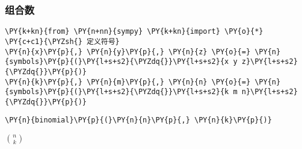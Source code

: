     \hypertarget{ux7ec4ux5408ux6570}{%
\subsubsection{组合数}\label{ux7ec4ux5408ux6570}}

    \begin{tcolorbox}[breakable, size=fbox, boxrule=1pt, pad at break*=1mm,colback=cellbackground, colframe=cellborder]
\begin{Verbatim}[commandchars=\\\{\}]
\PY{k+kn}{from} \PY{n+nn}{sympy} \PY{k+kn}{import} \PY{o}{*}
\PY{c+c1}{\PYZsh{} 定义符号}
\PY{n}{x}\PY{p}{,} \PY{n}{y}\PY{p}{,} \PY{n}{z} \PY{o}{=} \PY{n}{symbols}\PY{p}{(}\PY{l+s+s2}{\PYZdq{}}\PY{l+s+s2}{x y z}\PY{l+s+s2}{\PYZdq{}}\PY{p}{)}
\PY{n}{k}\PY{p}{,} \PY{n}{m}\PY{p}{,} \PY{n}{n} \PY{o}{=} \PY{n}{symbols}\PY{p}{(}\PY{l+s+s2}{\PYZdq{}}\PY{l+s+s2}{k m n}\PY{l+s+s2}{\PYZdq{}}\PY{p}{)}
\end{Verbatim}
\end{tcolorbox}

    \begin{tcolorbox}[breakable, size=fbox, boxrule=1pt, pad at break*=1mm,colback=cellbackground, colframe=cellborder]
\begin{Verbatim}[commandchars=\\\{\}]
\PY{n}{binomial}\PY{p}{(}\PY{n}{n}\PY{p}{,} \PY{n}{k}\PY{p}{)}
\end{Verbatim}
\end{tcolorbox}
 
            
    
    $\displaystyle {\binom{n}{k}}$
